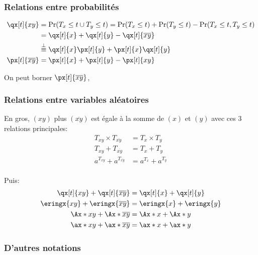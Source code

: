 \documentclass[10pt, french]{article}
\begin{document}
\begin{multicols*}{2}
\subsubsection*{Relations entre probabilités}
\begin{align*}
	\qx[t]{xy}
	&=	\Pr(T_{x} \leq t \cup T_{y}	\leq	t)	
	=	\Pr(T_{x} \leq t) + \Pr(T_{y}	\leq	t)	 - \Pr(T_{x} \leq t, T_{y}	\leq	t)	\\
	&=	\qx[t]{x} + \qx[t]{y} - \qx[t]{\overline{xy}}	\\
	&\overset{\perp}{\equiv}	\qx[t]{x}\px[t]{y} + \px[t]{x}\qx[t]{y}	\\
	\px[t]{\overline{xy}}
	&=	\px[t]{x} + \px[t]{y} - \px[t]{xy}	\\
\end{align*}

On peut borner $\px[t]{\overline{xy}}$, 

\subsubsection*{Relations entre variables aléatoires}
En gros, $(xy)$ plus $(\overline{xy})$ est égale à la somme de $(x)$ et $(y)$ avec ces 3 relations principales:
\begin{align*}
	T_{xy} \times T_{\overline{xy}}
	&=	T_{x} \times T_{y}	\\
	T_{xy} + T_{\overline{xy}}
	&=	T_{x} + T_{y}	\\
	a^{T_{xy}} + a^{T_{\overline{xy}}}
	&=	a^{T_{x}} + a^{T_{y}}	\\
\end{align*}

Puis:
\begin{align*}
	\qx[t]{xy} + \qx[t]{\overline{xy}}	&=	\qx[t]{x} + \qx[t]{y}	\\
	\eringx{xy} + \eringx{\overline{xy}}	&=	\eringx{x} + \eringx{y}	\\
	\Ax*{xy} + \Ax*{\overline{xy}}	&=	\Ax*{x} + \Ax*{y}	\\
	\ax*{xy} + \ax*{\overline{xy}}	&=	\ax*{x} + \ax*{y}	\\
\end{align*}

\subsubsection*{D'autres notations}


\end{multicols*}
\end{document}
